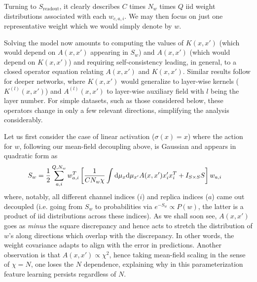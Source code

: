Turning to $S_{\text{readout}}$, it clearly describes $C$ times $N_w$ times $Q$ iid weight distributions associated with each ${w}_{c,a,i}$. We may then focus on just one representative weight which we would simply denote by ${w}$. 

Solving the model now amounts to computing the values of $K(x,x')$ (which would depend on $A(x,x')$ appearing in $S_w$) and $A(x,x')$ (which would depend on $K(x,x')$) and requiring self-consistency leading, in general, to a closed operator equation relating $A(x,x')$ and $K(x,x')$. Similar results follow for deeper networks, where $K(x,x')$ would generalize to layer-wise kernels ($K^{(l)}(x,x')$) and $A^{(l)}(x,x')$ to layer-wise auxiliary field with $l$ being the layer number. For simple datasets, such as those considered below, these operators change in only a few relevant directions, simplifying the analysis considerably.  

Let us first consider the case of linear activation ($\sigma(x)=x$) where the action for ${w}$, following our mean-field decoupling above, is Gaussian and appears in quadratic form as  
\begin{align}
S_w &= \frac{1}{2} \sum_{a,i}^{Q,N_w} {w}_{a,i}^T \left[\frac{1}{{C} N_w \chi} \int \text{d}\mu_x \text{d}\mu_{x'} A(x,x') {x}'_i {x}^{T}_i+I_{S \times S}S\right] {w}_{a,i} 
\end{align}
where, notably, all different channel indices ($i$) and replica indices ($a$) came out decoupled (i.e. going from $S_w$ to probabilities via $e^{-S_w}\propto P(w)$, the latter is a product of iid distributions across these indices). As we shall soon see, $A(x,x')$ goes as {\it minus} the square discrepancy and hence acts to stretch the distribution of $w$'s along directions which overlap with the discrepancy. In other words, the weight covariance adapts to align with the error in predictions. Another observation is that $A(x,x') \propto \chi^2$, hence taking mean-field scaling in the sense of $\chi = N$, one loses the $N$ dependence, explaining why in this parameterization feature learning persists regardless of $N$. 

